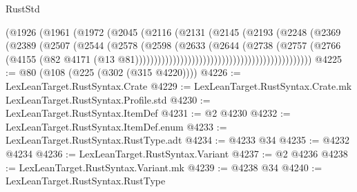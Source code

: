 \begin{lexlean}{RustStd}
\begin{coremodule}
{\begin{coremodule}
{{{{{{{{{{{{{{{{{{{{{{{{{{{{{{{{{{{{{{{{{{{{{{{{{{{{{{{                                                    (@1926
                                                      (@1961
                                                        (@1972
                                                          (@2045
                                                            (@2116
                                                              (@2131
                                                                (@2145
                                                                  (@2193
                                                                    (@2248
                                                                      (@2369
                                                                        (@2389
                                                                          (@2507
                                                                            (@2544
                                                                              (@2578
                                                                                (@2598
                                                                                  (@2633
                                                                                    (@2644
                                                                                      (@2738
                                                                                        (@2757
                                                                                          (@2766
                                                                                            (@4155
                                                                                              (@82
                                                                                                @4171
                                                                                                (@13
                                                                                                  @81)))))))))))))))))))))))))))))))))))))))))))))))
@4225 := @80 (@108 (@225 (@302 (@315 @4220))))
@4226 := LexLeanTarget.RustSyntax.Crate
@4229 := LexLeanTarget.RustSyntax.Crate.mk LexLeanTarget.RustSyntax.Profile.std
@4230 := LexLeanTarget.RustSyntax.ItemDef
@4231 := @2 @4230
@4232 := LexLeanTarget.RustSyntax.ItemDef.enum
@4233 := LexLeanTarget.RustSyntax.RustType.adt
@4234 := @4233 @34
@4235 := @4232 @4234
@4236 := LexLeanTarget.RustSyntax.Variant
@4237 := @2 @4236
@4238 := LexLeanTarget.RustSyntax.Variant.mk
@4239 := @4238 @34
@4240 := LexLeanTarget.RustSyntax.RustType
}}}}}}}}}}}}}}}}}}}}}}}}}}}}}}}}}}}}}}}}}}}}}}}}}}}}}}}
\end{coremodule}}
\end{coremodule}
\end{lexlean}
